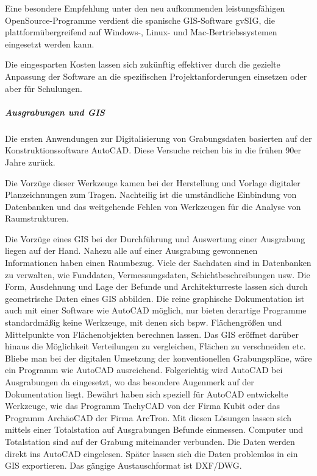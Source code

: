 Eine besondere Empfehlung unter den neu aufkommenden leistungsfähigen OpenSource-Programme verdient die spanische GIS-Software gvSIG, die plattformübergreifend auf Windows-, Linux- und Mac-Bertriebssystemen eingesetzt werden kann.

Die eingesparten Kosten lassen sich zukünftig effektiver durch die gezielte Anpassung der Software an die spezifischen Projektanforderungen einsetzen oder aber für Schulungen.

\subparagraph{Ausgrabungen und GIS} Die ersten Anwendungen zur Digitalisierung von Grabungsdaten basierten auf der Konstruktionssoftware AutoCAD. Diese Versuche reichen bis in die frühen 90er Jahre zurück.

Die Vorzüge dieser Werkzeuge kamen bei der Herstellung und Vorlage digitaler Planzeichnungen zum Tragen. Nachteilig ist die umständliche Einbindung von Datenbanken und das weitgehende Fehlen von Werkzeugen für die Analyse von Raumstrukturen. 

Die Vorzüge eines GIS bei der Durchführung und Auswertung einer Ausgrabung liegen auf der Hand. Nahezu alle auf einer Ausgrabung gewonnenen Informationen haben einen Raumbezug. Viele der Sachdaten sind in Datenbanken zu verwalten, wie Funddaten, Vermessungsdaten, Schichtbeschreibungen usw.  Die Form, Ausdehnung und Lage der Befunde und Architekturreste lassen sich durch geometrische Daten eines GIS abbilden. Die reine graphische Dokumentation ist auch mit einer Software wie AutoCAD möglich, nur bieten derartige Programme standardmäßig keine Werkzeuge, mit denen sich bspw. Flächengrößen und Mittelpunkte von Flächenobjekten berechnen lassen. Das GIS eröffnet darüber hinaus die Möglichkeit Verteilungen zu vergleichen, Flächen zu verschneiden etc. Bliebe man bei der digitalen Umsetzung der konventionellen Grabungspläne, wäre ein Programm wie AutoCAD ausreichend. Folgerichtig wird AutoCAD bei Ausgrabungen da eingesetzt, wo das besondere Augenmerk auf der Dokumentation liegt. Bewährt haben sich speziell für AutoCAD entwickelte Werkzeuge, wie das Programm TachyCAD von der Firma Kubit oder das Programm ArchäoCAD der Firma ArcTron. Mit diesen Lösungen lassen sich mittels einer Totalstation auf Ausgrabungen Befunde einmessen. Computer und Totalstation sind auf der Grabung miteinander verbunden. Die Daten werden direkt ins AutoCAD eingelesen. Später lassen sich die Daten problemlos in ein GIS exportieren. Das gängige Austauschformat ist DXF/DWG.


